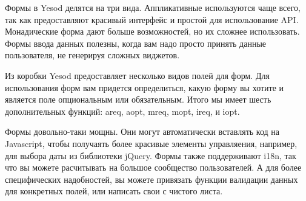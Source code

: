 Формы в Yesod делятся на три вида. Аппликативные используются чаще всего, так как
предоставляют красивый интерфейс и простой для использование API. Монадические форма дают
больше возможностей, но их сложнее использовать. Формы ввода данных полезны, когда вам
надо просто принять данные пользователя, не генерируя сложных виджетов.

Из коробки Yesod предоставляет несколько видов полей для форм. Для использования
форм вам придется определиться, какую форму вы хотите и является поле опциональным или
обязательным. Итого мы имеет шесть дополнительных функций: areq, aopt, mreq, mopt, ireq,
и iopt.

Формы довольно-таки мощны. Они могут автоматически вставлять код на Javascript, чтобы
получаять более красивые элементы управляения, например, для выбора даты из библиотеки 
jQuery. Формы также поддерживают  i18n, так что вы можете расчитывать на большое
сообщество пользователей. А для более специфических надобностей, вы можете привязать
функции валидации данных для конкретных полей, или написать свои с чистого  листа.

